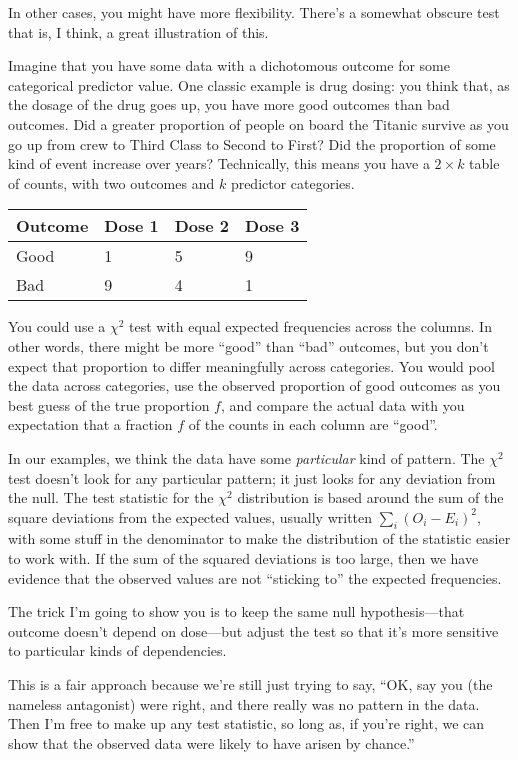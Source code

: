 In other cases, you might have more flexibility. There's a somewhat
obscure test that is, I think, a great illustration of this.

Imagine that you have some data with a dichotomous outcome for some
categorical predictor value. One classic example is drug dosing: you
think that, as the dosage of the drug goes up, you have more good
outcomes than bad outcomes. Did a greater proportion of people on board
the Titanic survive as you go up from crew to Third Class to Second to
First? Did the proportion of some kind of event increase over years?
Technically, this means you have a \(2 \times k\) table of counts, with
two outcomes and \(k\) predictor categories.

\begin{longtable}[]{@{}llll@{}}
\toprule
Outcome & Dose 1 & Dose 2 & Dose 3\tabularnewline
\midrule
\endhead
Good & 1 & 5 & 9\tabularnewline
Bad & 9 & 4 & 1\tabularnewline
\bottomrule
\end{longtable}

You could use a \(\chi^2\) test with equal expected frequencies across
the columns. In other words, there might be more ``good'' than ``bad''
outcomes, but you don't expect that proportion to differ meaningfully
across categories. You would pool the data across categories, use the
observed proportion of good outcomes as you best guess of the true
proportion \(f\), and compare the actual data with you expectation that
a fraction \(f\) of the counts in each column are ``good''.

In our examples, we think the data have some \emph{particular} kind of
pattern. The \(\chi^2\) test doesn't look for any particular pattern; it
just looks for any deviation from the null. The test statistic for the
\(\chi^2\) distribution is based around the sum of the square deviations
from the expected values, usually written \(\sum_i (O_i - E_i)^2\), with
some stuff in the denominator to make the distribution of the statistic
easier to work with. If the sum of the squared deviations is too large,
then we have evidence that the observed values are not ``sticking to''
the expected frequencies.

The trick I'm going to show you is to keep the same null
hypothesis---that outcome doesn't depend on dose---but adjust the test
so that it's more sensitive to particular kinds of dependencies.

This is a fair approach because we're still just trying to say, ``OK,
say you (the nameless antagonist) were right, and there really was no
pattern in the data. Then I'm free to make up any test statistic, so
long as, if you're right, we can show that the observed data were likely
to have arisen by chance.''

